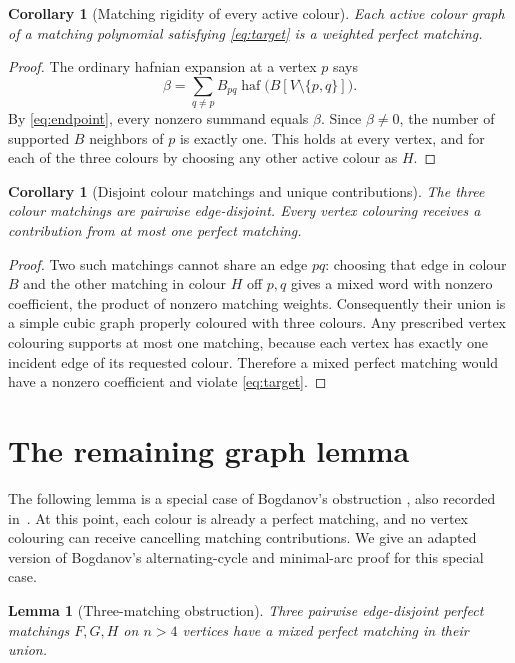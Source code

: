 \documentclass[11pt]{article}
\newtheorem{lemma}[theorem]{Lemma}
\newtheorem{corollary}[theorem]{Corollary}
\theoremstyle{definition}
\theoremstyle{plain}
\numberwithin{equation}{section}
\begin{document}
\begin{corollary}[Matching rigidity of every active colour]\label{cor:matching}
Each active colour graph of a matching polynomial satisfying
\eqref{eq:target} is a weighted perfect matching.
\end{corollary}

\begin{proof}
The ordinary hafnian expansion at a vertex \(p\) says
\[
 \beta=\sum_{q\ne p}B_{pq}\operatorname{haf}\bigl(B[V\setminus\{p,q\}]\bigr).
\]
By \eqref{eq:endpoint}, every nonzero summand equals \(\beta\). Since
\(\beta\ne0\), the number of supported \(B\) neighbors of \(p\) is exactly
one. This holds at every vertex, and for each of the three colours by choosing
any other active colour as \(H\).
\end{proof}

\begin{corollary}[Disjoint colour matchings and unique contributions]\label{cor:unique}
The three colour matchings are pairwise edge-disjoint. Every vertex colouring
receives a contribution from at most one perfect matching.
\end{corollary}

\begin{proof}
Two such matchings cannot share an edge \(pq\): choosing that edge in colour
\(B\) and the other matching in colour \(H\) off \(p,q\) gives a mixed word
with nonzero coefficient, the product of nonzero matching weights.
Consequently their union is a simple cubic graph properly coloured with three
colours. Any prescribed vertex colouring supports at most one matching, because each
vertex has exactly one incident edge of its requested colour. Therefore a
mixed perfect matching would have a nonzero coefficient and violate
\eqref{eq:target}.
\end{proof}

\section{The remaining graph lemma}\label{sec:graph}

The following lemma is a special case of Bogdanov's obstruction
\cite{bogdanov}, also recorded in~\cite[Theorem~7]{cgi}. At this point, each colour is already a
perfect matching, and no vertex colouring can receive cancelling matching
contributions. We give an adapted version of Bogdanov's alternating-cycle
and minimal-arc proof for this special case.

\begin{lemma}[Three-matching obstruction]\label{lem:graph}
Three pairwise edge-disjoint perfect matchings \(F,G,H\) on \(n>4\) vertices
have a mixed perfect matching in their union.
\end{lemma}
\end{document}
